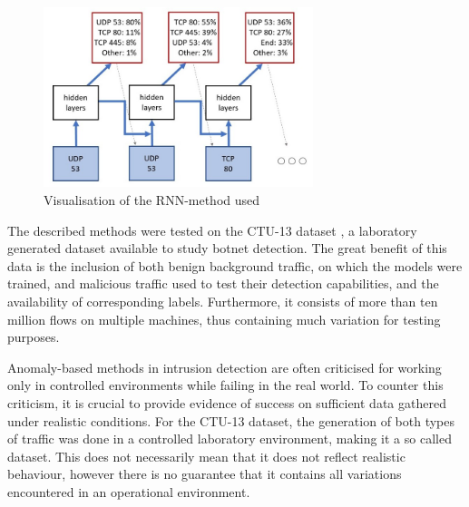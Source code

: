\documentclass[a4paper,12pt,twoside]{report}
\begin{document}
\begin{figure}
\centering
\includegraphics[width=0.7\textwidth]{images/RNN.jpg}
\caption{Visualisation of the RNN-method used}\label{RNN}
\end{figure}


The described methods were tested on the CTU-13 dataset \cite{garcia2014empirical}, a laboratory generated dataset available to study botnet detection. The great benefit of this data is the inclusion of both benign background traffic, on which the models were trained, and malicious traffic used to test their detection capabilities, and the availability of corresponding labels. Furthermore, it consists of more than ten million flows on multiple machines, thus containing much variation for testing purposes.

Anomaly-based methods in intrusion detection are often criticised for working only in controlled environments while failing in the real world. To counter this criticism, it is crucial to provide evidence of success on sufficient data gathered under realistic conditions. For the CTU-13 dataset, the generation of both types of traffic was done in a controlled laboratory environment, making it a so called  dataset. This does not necessarily mean that it does not reflect realistic behaviour, however there is no guarantee that it contains all variations encountered in an operational environment. 
\end{document}
